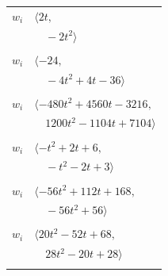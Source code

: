 \documentclass[11pt]{article}
\begin{document}
\begin{longtable}{@{}ll@{}}
$w_i$ & $\langle 2t,$\\
 & $\quad -2t^{2}\rangle$\\
\addlinespace[2pt]
\multicolumn{2}{@{}p{0.97\textwidth}@{}}{$i=21$, $D_i=4$, $\rho_{ij}$: $9{:}2, \allowbreak 12{:}2, \allowbreak 35{:}1, \allowbreak 37{:}1, \allowbreak 40{:}1, \allowbreak 57{:}1, \allowbreak 61{:}1$}\\
$w_i$ & $\langle -24,$\\
 & $\quad -4t^{2}+4t-36\rangle$\\
\addlinespace[2pt]
\multicolumn{2}{@{}p{0.97\textwidth}@{}}{$i=22$, $D_i=4$, $\rho_{ij}$: $11{:}2, \allowbreak 16{:}1, \allowbreak 19{:}2, \allowbreak 30{:}2, \allowbreak 31{:}2, \allowbreak 37{:}2, \allowbreak 41{:}2, \allowbreak 42{:}1, \allowbreak 50{:}2, \allowbreak 52{:}1, \allowbreak 54{:}1, \allowbreak 55{:}1, \allowbreak 58{:}2, \allowbreak 60{:}2, \allowbreak 61{:}2$}\\
$w_i$ & $\langle -480t^{2}+4560t-3216,$\\
 & $\quad 1200t^{2}-1104t+7104\rangle$\\
\addlinespace[2pt]
\multicolumn{2}{@{}p{0.97\textwidth}@{}}{$i=23$, $D_i=1$, $\rho_{ij}$: $4{:}2, \allowbreak 33{:}2, \allowbreak 35{:}1, \allowbreak 53{:}1, \allowbreak 55{:}2, \allowbreak 57{:}1, \allowbreak 61{:}1$}\\
$w_i$ & $\langle -t^{2}+2t+6,$\\
 & $\quad -t^{2}-2t+3\rangle$\\
\addlinespace[2pt]
\multicolumn{2}{@{}p{0.97\textwidth}@{}}{$i=24$, $D_i=2$, $\rho_{ij}$: $2{:}1, \allowbreak 6{:}2, \allowbreak 17{:}1, \allowbreak 34{:}2, \allowbreak 35{:}1, \allowbreak 36{:}1, \allowbreak 41{:}2, \allowbreak 51{:}2, \allowbreak 56{:}1, \allowbreak 57{:}1, \allowbreak 58{:}1$}\\
$w_i$ & $\langle -56t^{2}+112t+168,$\\
 & $\quad -56t^{2}+56\rangle$\\
\addlinespace[2pt]
\multicolumn{2}{@{}p{0.97\textwidth}@{}}{$i=25$, $D_i=4$, $\rho_{ij}$: $1{:}2, \allowbreak 10{:}2, \allowbreak 17{:}1, \allowbreak 28{:}1, \allowbreak 29{:}2, \allowbreak 32{:}2, \allowbreak 37{:}2$}\\
$w_i$ & $\langle 20t^{2}-52t+68,$\\
 & $\quad 28t^{2}-20t+28\rangle$\\
\addlinespace[2pt]
\multicolumn{2}{@{}p{0.97\textwidth}@{}}{$i=26$, $D_i=4$, $\rho_{ij}$: $0{:}1, \allowbreak 10{:}2, \allowbreak 12{:}1, \allowbreak 14{:}1, \allowbreak 36{:}2, \allowbreak 60{:}1, \allowbreak 61{:}1$}\\

\end{longtable}
\end{document}
